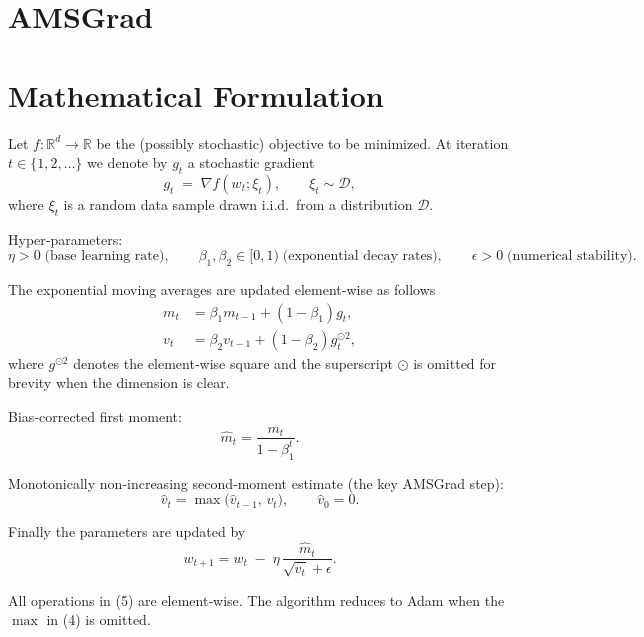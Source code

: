 \documentclass[11pt]{article}
\newcommand{\R}{\mathbb{R}}
\begin{document}
\section*{AMSGrad}

\section*{Mathematical Formulation}
Let $f:\R^{d}\rightarrow\R$ be the (possibly stochastic) objective to be minimized.  
At iteration $t\in\{1,2,\dots\}$ we denote by $g_{t}$ a stochastic gradient
\[
g_{t}\;=\;\nabla f(w_{t};\xi_{t}),\qquad \xi_{t}\sim\mathcal{D},
\]
where $\xi_{t}$ is a random data sample drawn i.i.d.\ from a distribution
$\mathcal{D}$.

Hyper‑parameters:
\[
\eta>0\;\text{(base learning rate)},\qquad
\beta_{1},\beta_{2}\in[0,1)\;\text{(exponential decay rates)},\qquad
\epsilon>0\;\text{(numerical stability)} .
\]

The exponential moving averages are updated element‑wise as follows
\begin{align}
m_{t} &= \beta_{1}m_{t-1}+(1-\beta_{1})g_{t}, \tag{1}\\[4pt]
v_{t} &= \beta_{2}v_{t-1}+(1-\beta_{2})g_{t}^{\odot 2}, \tag{2}
\end{align}
where $g^{\odot 2}$ denotes the element‑wise square and the superscript
$\odot$ is omitted for brevity when the dimension is clear.

Bias‑corrected first moment:
\[
\hat m_{t}= \frac{m_{t}}{1-\beta_{1}^{t}} . \tag{3}
\]

Monotonically non‑increasing second‑moment estimate (the key AMSGrad step):
\[
\hat v_{t}= \max\!\big(\hat v_{t-1},\,v_{t}\big),\qquad\hat v_{0}=0. \tag{4}
\]

Finally the parameters are updated by
\[
w_{t+1}= w_{t}\;-\;\eta\,
\frac{\hat m_{t}}{\sqrt{\hat v_{t}}+\epsilon}. \tag{5}
\]

All operations in (5) are element‑wise.  The algorithm reduces to Adam
when the $\max$ in (4) is omitted.
\end{document}

